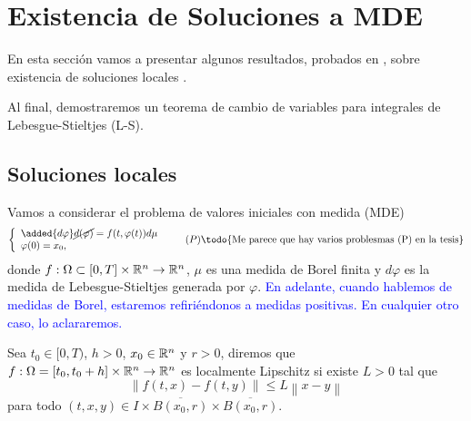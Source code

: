  
 
 
 
 
 
 
 \section{Existencia de Soluciones a MDE}
 
 
 
 
 
  En esta sección vamos a presentar algunos resultados, probados en \cite{P.Mazzone}, sobre existencia de soluciones locales . 


  
  Al final, demostraremos un teorema de cambio de variables para integrales de Lebesgue-Stieltjes (L-S). 
  
  
 \subsection{Soluciones locales}

 Vamos a considerar el problema de valores iniciales con medida (MDE)
 \begin{equation}\label{Problema P}
 	\left\lbrace \begin{array}{l}
 		\added{d\varphi}\cancel{d(\varphi)}=f(t,\varphi(t))d\mu\\
 		\varphi(0)=x_0,
 	\end{array}\right. \tag{${P}$}\reversemarginpar\textrm{\todo{Me parece que hay varios problesmas (P) en la tesis}}
 \end{equation}
 donde $f:\Omega\subset[0,T]\times\mathbb{R}^n\to\mathbb{R}^{n}$, $\mu$ es una medida de Borel  finita y $d\varphi$ es la medida de Lebesgue-Stieltjes generada por $\varphi$. \textcolor{blue}{ En adelante, cuando hablemos de medidas de Borel, estaremos refiriéndonos a medidas  positivas. En cualquier otro caso, lo aclararemos.}
 


\begin{defi}
    Sea $t_0\in [0,T)$, $h>0$,  $x_0\in \mathbb{R}^n$ y $r>0$, diremos que $f:\Omega=[t_0,t_0+h]\times\mathbb{R}^n\to\mathbb{R}^{n}$ es localmente Lipschitz  si  existe $ L>0$  tal que
	\begin{equation}\label{f lipschitz}
	\left\| f(t,x)-f(t,y)\right\|\leq L\left\| x-y\right\|
\end{equation}
	para todo $(t,x,y)\in I\times \overline{B(x_0,r)}\times \overline{B(x_0,r)}$.
\end{defi}

